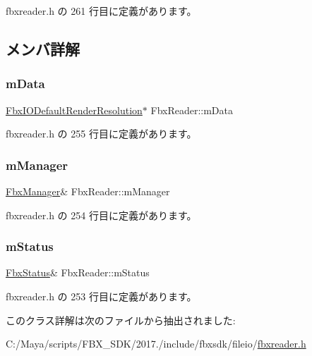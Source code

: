  fbxreader.\+h の 261 行目に定義があります。



\subsection{メンバ詳解}
\mbox{\label{class_fbx_reader_adf13af19c89bdeffde6fdf2e2ebdf7ac}} 
\subsubsection{\texorpdfstring{m\+Data}{mData}}
{\footnotesize\ttfamily \hyperlink{class_fbx_i_o_default_render_resolution}{Fbx\+I\+O\+Default\+Render\+Resolution}$\ast$ Fbx\+Reader\+::m\+Data\hspace{0.3cm}{\ttfamily [protected]}}



 fbxreader.\+h の 255 行目に定義があります。

\mbox{\label{class_fbx_reader_a572c9e4dc988f01da8ffb6e16ef4cca2}} 
\subsubsection{\texorpdfstring{m\+Manager}{mManager}}
{\footnotesize\ttfamily \hyperlink{class_fbx_manager}{Fbx\+Manager}\& Fbx\+Reader\+::m\+Manager\hspace{0.3cm}{\ttfamily [protected]}}



 fbxreader.\+h の 254 行目に定義があります。

\mbox{\label{class_fbx_reader_a8a9bd15f63e9b7ab1ad155608d4db1e0}} 
\subsubsection{\texorpdfstring{m\+Status}{mStatus}}
{\footnotesize\ttfamily \hyperlink{class_fbx_status}{Fbx\+Status}\& Fbx\+Reader\+::m\+Status\hspace{0.3cm}{\ttfamily [protected]}}



 fbxreader.\+h の 253 行目に定義があります。



このクラス詳解は次のファイルから抽出されました\+:\begin{DoxyCompactItemize}
\item 
C\+:/\+Maya/scripts/\+F\+B\+X\+\_\+\+S\+D\+K/2017./include/fbxsdk/fileio/\hyperlink{fbxreader_8h}{fbxreader.\+h}\end{DoxyCompactItemize}
